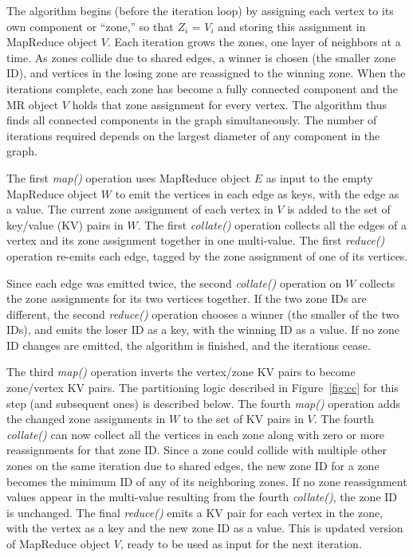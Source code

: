 The algorithm begins (before the iteration loop) by assigning each
vertex to its own component or ``zone,'' so that $Z_i$ = $V_i$ and
storing this assignment in MapReduce object $V$.  Each iteration grows
the zones, one layer of neighbors at a time.  As zones collide due to
shared edges, a winner is chosen (the smaller zone ID), and vertices
in the losing zone are reassigned to the winning zone.  When the
iterations complete, each zone has become a fully connected component
and the MR object $V$ holds that zone assignment for every vertex.
The algorithm thus finds all connected components in the graph
simultaneously.  The number of iterations required depends on the
largest diameter of any component in the graph.

The first {\it map()} operation uses MapReduce object $E$ as input to
the empty MapReduce object $W$ to emit the vertices in each edge as
keys, with the edge as a value.  The current zone assignment of each
vertex in $V$ is added to the set of key/value (KV) pairs in $W$.  The
first {\it collate()} operation collects all the edges of a vertex and
its zone assignment together in one multi-value.  The first {\it
reduce()} operation re-emits each edge, tagged by the zone assignment
of one of its vertices.

Since each edge was emitted twice, the second {\it collate()}
operation on $W$ collects the zone assignments for its two vertices
together.  If the two zone IDs are different, the second {\it
reduce()} operation chooses a winner (the smaller of the two IDs), and
emits the loser ID as a key, with the winning ID as a value.  If no
zone ID changes are emitted, the algorithm is finished, and the
iterations cease.

The third {\it map()} operation inverts the vertex/zone KV pairs to
become zone/vertex KV pairs.  The partitioning logic described in
Figure~\ref{fig:cc} for this step (and subsequent ones) is described
below.  The fourth {\it map()} operation adds the changed zone
assignments in $W$ to the set of KV pairs in $V$.  The fourth {\it
collate()} can now collect all the vertices in each zone along with
zero or more reassignments for that zone ID.  Since a zone could
collide with multiple other zones on the same iteration due to shared
edges, the new zone ID for a zone becomes the minimum ID of any of its
neighboring zones.  If no zone reassignment values appear in the
multi-value resulting from the fourth {\it collate()}, the zone ID is
unchanged.  The final {\it reduce()} emits a KV pair for each vertex
in the zone, with the vertex as a key and the new zone ID as a value.
This is updated version of MapReduce object $V$, ready to be used as
input for the next iteration.

